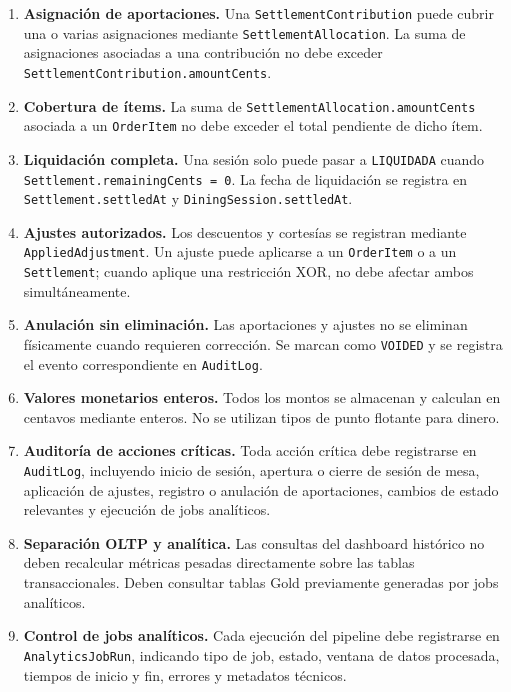 \begin{enumerate}
  \item \textbf{Asignación de aportaciones.}
  Una \texttt{SettlementContribution} puede cubrir una o varias asignaciones mediante
  \texttt{SettlementAllocation}. La suma de asignaciones asociadas a una contribución no
  debe exceder \texttt{SettlementContribution.amountCents}.

  \item \textbf{Cobertura de ítems.}
  La suma de \texttt{SettlementAllocation.amountCents} asociada a un
  \texttt{OrderItem} no debe exceder el total pendiente de dicho ítem.

  \item \textbf{Liquidación completa.}
  Una sesión solo puede pasar a \texttt{LIQUIDADA} cuando
  \texttt{Settlement.remainingCents = 0}. La fecha de liquidación se registra en
  \texttt{Settlement.settledAt} y \texttt{DiningSession.settledAt}.

  \item \textbf{Ajustes autorizados.}
  Los descuentos y cortesías se registran mediante \texttt{AppliedAdjustment}. Un ajuste
  puede aplicarse a un \texttt{OrderItem} o a un \texttt{Settlement}; cuando aplique una
  restricción XOR, no debe afectar ambos simultáneamente.

  \item \textbf{Anulación sin eliminación.}
  Las aportaciones y ajustes no se eliminan físicamente cuando requieren corrección. Se
  marcan como \texttt{VOIDED} y se registra el evento correspondiente en
  \texttt{AuditLog}.

  \item \textbf{Valores monetarios enteros.}
  Todos los montos se almacenan y calculan en centavos mediante enteros. No se utilizan
  tipos de punto flotante para dinero.

  \item \textbf{Auditoría de acciones críticas.}
  Toda acción crítica debe registrarse en \texttt{AuditLog}, incluyendo inicio de sesión,
  apertura o cierre de sesión de mesa, aplicación de ajustes, registro o anulación de
  aportaciones, cambios de estado relevantes y ejecución de jobs analíticos.

  \item \textbf{Separación OLTP y analítica.}
  Las consultas del dashboard histórico no deben recalcular métricas pesadas directamente
  sobre las tablas transaccionales. Deben consultar tablas Gold previamente generadas por
  jobs analíticos.

  \item \textbf{Control de jobs analíticos.}
  Cada ejecución del pipeline debe registrarse en \texttt{AnalyticsJobRun}, indicando
  tipo de job, estado, ventana de datos procesada, tiempos de inicio y fin, errores y
  metadatos técnicos.


\end{enumerate}
